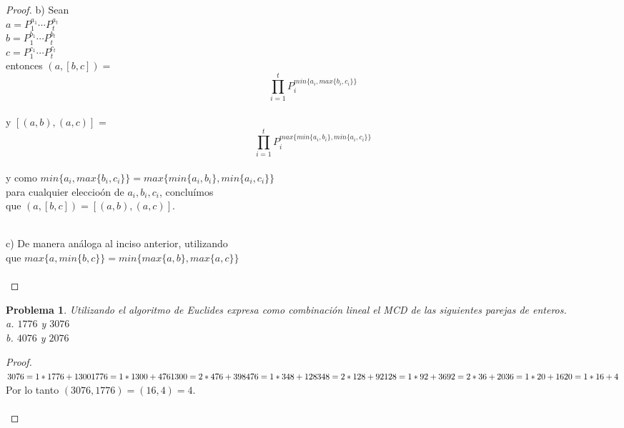 \documentclass[12pt,oneside]{article}
\newtheorem{prob}{Problema}
\begin{document}
\begin{proof}
b) Sean\\
$a = P_1^{a_1} \cdots P_t^{a_t}$\\
$b = P_1^{b_1} \cdots P_t^{b_t}$\\
$c = P_1^{c_1} \cdots P_t^{c_t}$\\
entonces $(a,[b,c]) =$  
\begin{equation*}
\prod_{i=1}^t  P_i^{min\{a_i,max\{b_i,c_i\}\}} \end{equation*}\\
y $[(a,b), (a,c)]$ =  \begin{equation*} \prod_{i=1}^t  P_i^{max\{min\{a_i,b_i\}, min\{a_i,c_i\}\}} \end{equation*}\\
y como $min\{a_i, max\{b_i,c_i\}\} = max\{min\{a_i,b_i\}, min\{a_i,c_i\}\}$\\
para cualquier eleccio\'on de $a_i, b_i, c_i$, conclu\'imos\\
que $(a,[b,c]) = [(a,b), (a,c)]$.\\\

c) De manera an\'aloga al inciso anterior, utilizando\\
que $max\{a,min\{b,c\}\} = min\{max\{a,b\},max\{a,c\}\}$\\\\
\end{proof}


\begin{prob} %
Utilizando el algoritmo de Euclides expresa como combinaci\'on lineal el MCD de las siguientes parejas de enteros.\\
a. $1776$ y $3076$\\ 
b. $4076$ y $2076$
\end{prob}

\begin{proof}
$3076 = 1*1776 + 1300\\
1776 = 1*1300 + 476\\
1300 = 2*476 + 398\\
476 = 1*348 + 128\\
348 = 2*128 + 92\\
128 = 1*92 + 36\\
92 = 2*36 + 20\\
36 = 1*20 + 16\\
20 = 1*16 + 4\\
$Por lo tanto $(3076, 1776) = (16,4) = 4$.\\\\
\end{proof}
\end{document}
